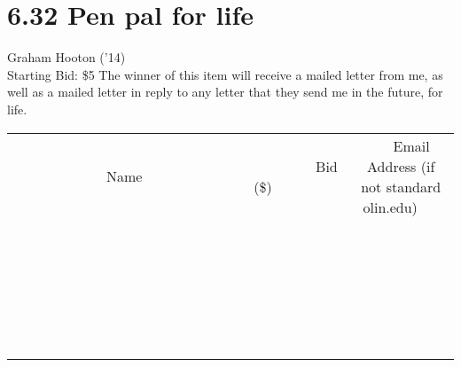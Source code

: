 \documentclass[11pt]{article}
\begin{document}
\section*{6.32 Pen pal for life}
Graham Hooton ('14)
\\
Starting Bid: \$5
\newline
The winner of this item will receive a mailed letter from me, as well as a mailed letter in reply to any letter that they send me in the future, for life.
\\[6ex]
\begin{tabular}{c c c}
~~~~~~~~~~~~~Name~~~~~~~~~~~~~ & ~~~~~~~~~Bid (\$)~~~~~~~~~  & ~~~Email Address (if not standard olin.edu)~~~\\
 & & \\
\hline
 & & \\
\hline
 & & \\
\hline
 & & \\
\hline
 & & \\
\hline
 & & \\
\hline
 & & \\
\hline
 & & \\
\hline
 & & \\
\hline
 & & \\
\hline
 & & \\
\hline
 & & \\
\hline
 & & \\
\hline
 & & \\
\hline
 & & \\
\hline
 & & \\
\hline
 & & \\
\hline
 & & \\
\hline
 & & \\
\hline
 & & \\
\hline
 & & \\
\hline
 & & \\
\hline
 & & \\
\hline
 & & \\
\hline
 & & \\
\hline
 & & \\
\hline
\end{tabular}
\newpage
\end{document}
